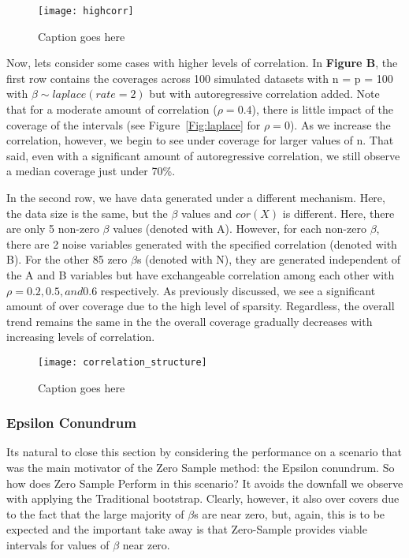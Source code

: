 \begin{figure}
  \texttt{[image: highcorr]}
  \caption{\label{Fig:highcorr} Caption goes here}
\end{figure}


Now, lets consider some cases with higher levels of correlation. In \textbf{Figure B}, the first row contains the coverages across 100 simulated datasets with n = p = 100 with $\beta \sim laplace(rate = 2)$ but with autoregressive correlation added. Note that for a moderate amount of correlation ($\rho = 0.4$), there is little impact of the coverage of the intervals (see Figure~\ref{Fig:laplace} for $\rho = 0$).  As we increase the correlation, however, we begin to see under coverage for larger values of n. That said, even with a significant amount of autoregressive correlation, we still observe a median coverage just under 70\%.

In the second row, we have data generated under a different mechanism. Here, the data size is the same, but the $\beta$ values and $cor(X)$ is different. Here, there are only 5 non-zero $\beta$ values (denoted with A). However, for each non-zero $\beta$, there are 2 noise variables generated with the specified correlation (denoted with B). For the other 85 zero $\beta$s (denoted with N), they are generated independent of the A and B variables but have exchangeable correlation among each other with $\rho = 0.2, 0.5, and 0.6$ respectively. As previously discussed, we see a significant amount of over coverage due to the high level of sparsity. Regardless, the overall trend remains the same in the the overall coverage gradually decreases with increasing levels of correlation.

\begin{figure}
  \texttt{[image: correlation\_structure]}
  \caption{\label{Fig:correlation_structure} Caption goes here}
\end{figure}

\subsubsection{Epsilon Conundrum}\label{Sec:Epsilon}

Its natural to close this section by considering the performance on a scenario that was the main motivator of the Zero Sample method: the Epsilon conundrum. So how does Zero Sample Perform in this scenario? It avoids the downfall we observe with applying the Traditional bootstrap. Clearly, however, it also over covers due to the fact that the large majority of $\beta$s are near zero, but, again, this is to be expected and the important take away is that Zero-Sample provides viable intervals for values of $\beta$ near zero.


